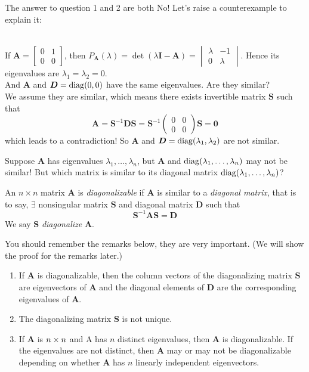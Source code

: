 The answer to question 1 and 2 are both No! Let's raise a counterexample to explain it:\\
\begin{example}\qquad\\
If $\bm A=\begin{bmatrix}
0&1\\0&0
\end{bmatrix}$, then $P_{\bm A}(\lambda)=\det(\lambda\bm I-\bm A)=\begin{vmatrix}\lambda&-1\\0&\lambda\end{vmatrix}
$.
Hence its eigenvalues are $\lambda_1=\lambda_2=0$.\\
And $\bm A$ and $\bm D=\operatorname{diag}(0,0)$ have the same eigenvalues. Are they similar?\\
We assume they are similar, which means there exists invertible matrix $\bm S$ such that
\[
\bm A=\bm S^{-1}\bm D\bm S=\bm S^{-1}\begin{pmatrix}
0&0\\0&0
\end{pmatrix}\bm S=\bm 0
\]
which leads to a contradiction!
So $\bm A$ and $\bm D=\operatorname{diag}(\lambda_1,\lambda_2)$ are not similar.
\end{example}
Suppose $\bm A$ has eigenvalues $\lambda_1,\dots,\lambda_n$, but $\bm A$ and $\operatorname{diag}(\lambda_1,\dots,\lambda_n)$ may not be similar! But which matrix is similar to its diagonal matrix $\operatorname{diag}(\lambda_1,\dots,\lambda_n)$?
\begin{definition}[Diagonalizable]
An $n\times n$ matrix $\bm A$ is \emph{diagonalizable} if $\bm A$ is similar to a \textit{diagonal matrix}, that is to say,
$\exists$ nonsingular matrix $\bm S$ and diagonal matrix $\bm D$ such that
\[
\bm S^{-1}\bm A\bm S=\bm D
\]
We say $\bm S$ \textit{diagonalize} $\bm A$.
\end{definition}
You should remember the remarks below, they are very important. (We will show the proof for the remarks later.)
\begin{remark}
\begin{enumerate}
\item
If $\bm A$ is diagonalizable, then the column vectors of the diagonalizing matrix $\bm S$
are eigenvectors of $\bm A$ and the diagonal elements of $\bm D$ are the corresponding
eigenvalues of $\bm A$.
\item
The diagonalizing matrix $\bm S$ is not unique.
\item
If $\bm A$ is $n\times n$ and A has $n$ distinct eigenvalues, then $\bm A$ is diagonalizable. If the
eigenvalues are not distinct, then $\bm A$ may or may not be diagonalizable depending
on whether $\bm A$ has $n$ linearly independent eigenvectors.
\end{enumerate}
\end{remark}
